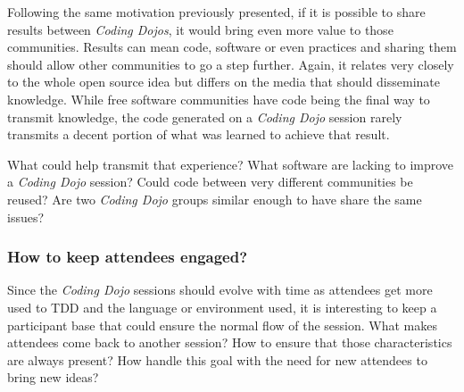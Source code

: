 Following the same motivation previously presented, if it is possible
to share results between \textit{Coding Dojos}, it would bring even
more value to those communities. Results can mean code, software or
even practices and sharing them should allow other communities to go a
step further. Again, it relates very closely to the whole open source
idea but differs on the media that should disseminate knowledge. While
free software communities have code being the final way to transmit
knowledge, the code generated on a \textit{Coding Dojo} session rarely
transmits a decent portion of what was learned to achieve that result.

What could help transmit that experience? What software are lacking to
improve a \textit{Coding Dojo} session? Could code between very
different communities be reused? Are two \textit{Coding Dojo} groups
similar enough to have share the same issues?

\subsubsection{How to keep attendees engaged?}

Since the \textit{Coding Dojo} sessions should evolve with time as
attendees get more used to TDD and the language or environment used,
it is interesting to keep a participant base that could ensure the
normal flow of the session. What makes attendees come back to another
session? How to ensure that those characteristics are always present?
How handle this goal with the need for new attendees to bring new
ideas?
